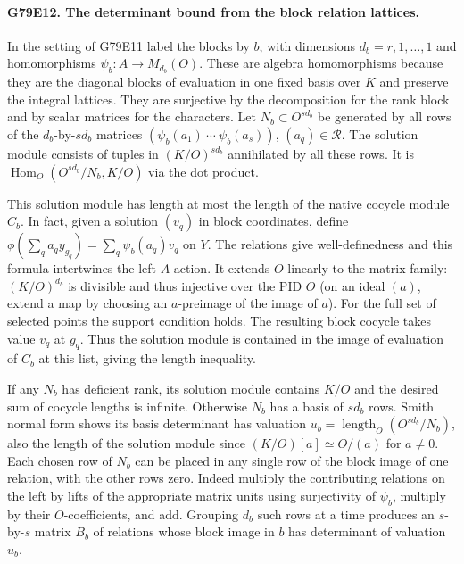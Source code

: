 \paragraph{G79E12. The determinant bound from the block relation lattices.}
In the setting of G79E11 label the blocks by $b$, with dimensions
$d_b=r,1,\ldots,1$ and homomorphisms
$\psi_b:A\to M_{d_b}(O)$. These are algebra homomorphisms
because they are the diagonal blocks of evaluation in one fixed
basis over $K$ and preserve the integral lattices. They are
surjective by the decomposition for the rank block and by scalar
matrices for the characters. Let $N_b\subset O^{s d_b}$ be
generated by all rows of the $d_b$-by-$s d_b$ matrices
$(\psi_b(a_1)\ \cdots\ \psi_b(a_s))$, $(a_q)\in\mathcal R$.
The solution module consists of tuples in $(K/O)^{s d_b}$
annihilated by all these rows. It is
$\operatorname{Hom}_O(O^{s d_b}/N_b,K/O)$ via the dot product.

This solution module has length at most the length of the native
cocycle module $C_b$. In fact, given a solution $(v_q)$ in block
coordinates, define $\phi(\sum_q a_q y_{g_q})=
\sum_q\psi_b(a_q)v_q$ on $Y$. The relations give well-definedness
and this formula intertwines the left $A$-action. It extends
$O$-linearly to the matrix family: $(K/O)^{d_b}$ is divisible and
thus injective over the PID $O$ (on an ideal $(a)$, extend a map
by choosing an $a$-preimage of the image of $a$).
For the full set of selected points the support condition holds.
The resulting block cocycle takes value $v_q$ at $g_q$. Thus the
solution module is contained in the image of evaluation of $C_b$
at this list, giving the length inequality.

If any $N_b$ has deficient rank, its solution module contains
$K/O$ and the desired sum of cocycle lengths is infinite.
Otherwise $N_b$ has a basis of $s d_b$ rows. Smith normal form
shows its basis determinant has valuation
$u_b=\operatorname{length}_O(O^{s d_b}/N_b)$, also the length
of the solution module since $(K/O)[a]\simeq O/(a)$ for $a\ne0$.
Each chosen row of $N_b$ can be placed in any single row of the
block image of one relation, with the other rows zero. Indeed
multiply the contributing relations on the left by lifts of the
appropriate matrix units using surjectivity of $\psi_b$, multiply
by their $O$-coefficients, and add. Grouping $d_b$ such rows at a
time produces an $s$-by-$s$ matrix $B_b$ of relations whose block
image in $b$ has determinant of valuation $u_b$.

